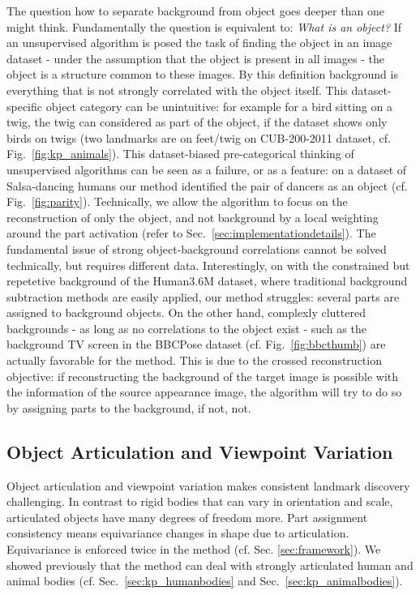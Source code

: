 		The question how to separate background from object goes deeper than one might think. Fundamentally the question is equivalent to: \textit{What is an object?}
		If an unsupervised algorithm is posed the task of finding the object in an image dataset - under the assumption that the object is present in all images - the object is a structure common to these images.
		By this definition background is everything that is not strongly correlated with the object itself.
		This dataset-specific object category can be unintuitive: for example for a bird sitting on a twig, the twig can considered as part of the object, if the dataset shows only birds on twigs (\eg two landmarks are on feet/twig on CUB-200-2011 dataset,  cf. Fig.~\ref{fig:kp_animals}).
		This dataset-biased pre-categorical thinking of unsupervised algorithms can be seen as a failure, or as a feature: on a dataset of Salsa-dancing humans our method identified the pair of dancers as an object (cf. Fig.~\ref{fig:parity}). 
		Technically, we allow the algorithm to focus on the reconstruction of only the object, and not background by a local weighting around the part activation (refer to Sec.~\ref{sec:implementationdetails}). The fundamental issue of strong object-background correlations cannot be solved technically, but requires different data.  Interestingly, on with the constrained but repetetive background of the Human3.6M dataset, where traditional background subtraction methods are easily applied, our method struggles: several parts are assigned to background objects. On the other hand, complexly cluttered backgrounds - as long as no correlations to the object exist - such as the background TV screen in the BBCPose dataset (cf. Fig.~\ref{fig:bbcthumb}) are actually favorable for the method. This is due to the crossed reconstruction objective: if reconstructing the background of the target image is possible with the information of the source appearance image, the algorithm will try to do so by assigning parts to the background, if not, not.


	\subsection{Object Articulation and Viewpoint Variation}\label{sec:articulation}
		Object articulation and viewpoint variation makes consistent landmark discovery challenging. In contrast to rigid bodies that can vary in orientation and scale, articulated objects have many degrees of freedom more. Part assignment consistency means equivariance \wrt changes in shape due to articulation. Equivariance is enforced twice in the method (cf. Sec. \ref{sec:framework}).
		We showed previously that the method can deal with strongly articulated human and animal bodies (cf. Sec.~\ref{sec:kp_humanbodies} and Sec.~\ref{sec:kp_animalbodies}).

